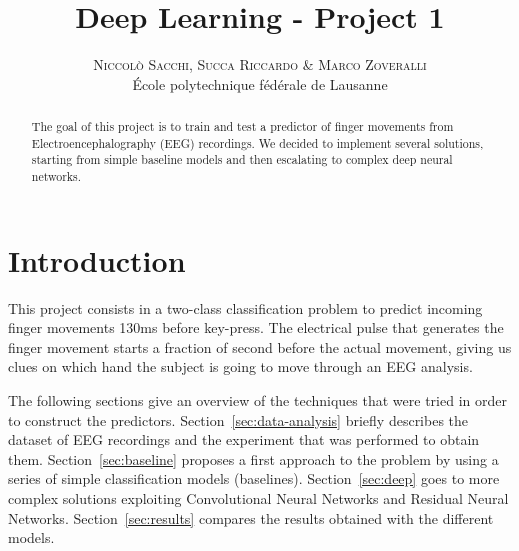 \documentclass[10pt,conference,compsocconf]{IEEEtran}
\begin{document}
	
\pretitle{\begin{center}\Huge\bfseries} %
\posttitle{\end{center}} %
\title{Deep Learning - Project 1}

\author{
	\textsc{Niccol\`{o} Sacchi, Succa Riccardo \& Marco Zoveralli}
	\normalsize{} \\
	\normalsize \'{E}cole polytechnique f\'{e}d\'{e}rale de Lausanne
}

\maketitle

\begin{abstract}
  The goal of this project is to train and test a predictor of finger movements from Electroencephalography (EEG) recordings. We decided to implement several solutions, starting from simple baseline models and then escalating to complex deep neural networks. 
\end{abstract}

\section{Introduction}
This project consists in a two-class classification problem to predict incoming finger movements 130ms before key-press. The electrical pulse that generates the finger movement starts a fraction of second before the actual movement, giving us clues on which hand the subject is going to move through an EEG analysis.

The following sections give an overview of the techniques that were tried in order to construct the predictors. Section~\ref{sec:data-analysis} briefly describes the dataset of EEG recordings and the experiment that was performed to obtain them. Section~\ref{sec:baseline} proposes a first approach to the problem by using a series of simple classification models (baselines). Section~\ref{sec:deep} goes to more complex solutions exploiting Convolutional Neural Networks and Residual Neural Networks. Section~\ref{sec:results} compares the results obtained with the different models.
\end{document}
